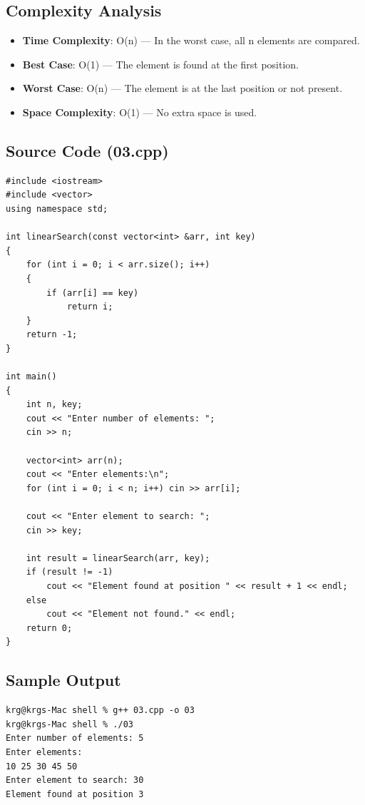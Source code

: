 \documentclass[a4paper,12pt]{article}
\begin{document}
\subsection*{Complexity Analysis}
\begin{itemize}
    \item \textbf{Time Complexity}: O(n) — In the worst case, all n elements are compared.
    \item \textbf{Best Case}: O(1) — The element is found at the first position.
    \item \textbf{Worst Case}: O(n) — The element is at the last position or not present.
    \item \textbf{Space Complexity}: O(1) — No extra space is used.
\end{itemize}

\subsection*{Source Code (03.cpp)}
\begin{lstlisting}[style=cppstyle]
#include <iostream>
#include <vector>
using namespace std;

int linearSearch(const vector<int> &arr, int key)
{
    for (int i = 0; i < arr.size(); i++)
    {
        if (arr[i] == key)
            return i;
    }
    return -1;
}

int main()
{
    int n, key;
    cout << "Enter number of elements: ";
    cin >> n;

    vector<int> arr(n);
    cout << "Enter elements:\n";
    for (int i = 0; i < n; i++) cin >> arr[i];

    cout << "Enter element to search: ";
    cin >> key;

    int result = linearSearch(arr, key);
    if (result != -1)
        cout << "Element found at position " << result + 1 << endl;
    else
        cout << "Element not found." << endl;
    return 0;
}
\end{lstlisting}

\subsection*{Sample Output}
\begin{lstlisting}[style=outputstyle]
krg@krgs-Mac shell % g++ 03.cpp -o 03
krg@krgs-Mac shell % ./03
Enter number of elements: 5
Enter elements:
10 25 30 45 50
Enter element to search: 30
Element found at position 3
\end{lstlisting}
\end{document}
